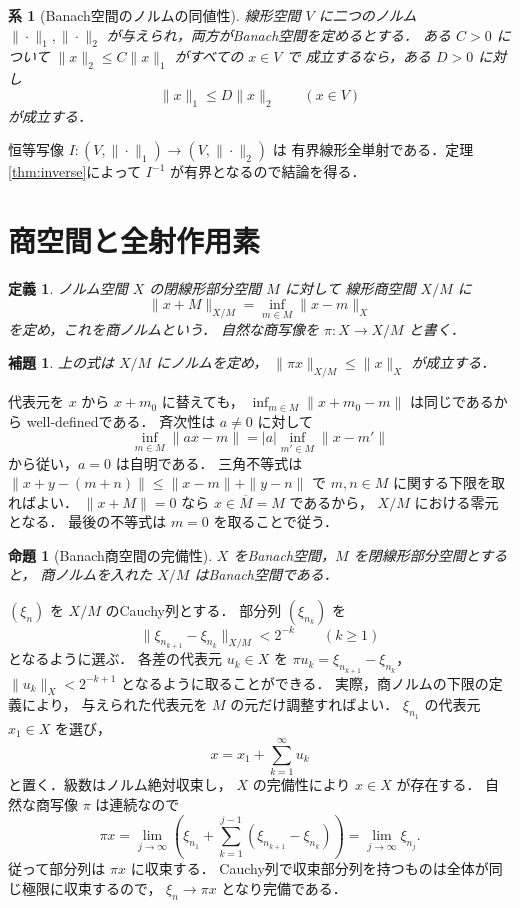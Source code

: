 \documentclass[a5paper,10pt,onecolumn]{jsarticle}
\makeatletter
\theoremstyle{mathnotetheorem}
\newtheorem{definition}[theorem]{定義}
\newtheorem{lemma}[theorem]{補題}
\newtheorem{proposition}[theorem]{命題}
\newtheorem{corollary}[theorem]{系}
\renewcommand{\proofname}{証明}
\renewenvironment{proof}[1][\proofname]{%
  \par\pushQED{\qed}\normalfont\topsep4\p@\@plus2\p@\relax
  \trivlist\item[\hskip\labelsep\bfseries #1]\ignorespaces
}{\popQED\endtrivlist\@endpefalse}
\makeatother
\begin{document}
\begin{corollary}[Banach空間のノルムの同値性]
線形空間 $V$ に二つのノルム $\|\cdot\|_1,\|\cdot\|_2$
が与えられ，両方がBanach空間を定めるとする．
ある $C>0$ について
$\|x\|_2\le C\|x\|_1$ がすべての $x\in V$ で
成立するなら，ある $D>0$ に対し
\[
 \|x\|_1\le D\|x\|_2\qquad(x\in V)
\]
が成立する．
\end{corollary}
\begin{proof}
恒等写像
$I:(V,\|\cdot\|_1)\to(V,\|\cdot\|_2)$ は
有界線形全単射である．定理\ref{thm:inverse}によって
$I^{-1}$ が有界となるので結論を得る．
\end{proof}

\section{商空間と全射作用素}

\begin{definition}
ノルム空間 $X$ の閉線形部分空間 $M$ に対して
線形商空間 $X/M$ に
\[
 \|x+M\|_{X/M}=\inf_{m\in M}\|x-m\|_X
\]
を定め，これを\emph{商ノルム}という．
自然な商写像を $\pi:X\to X/M$ と書く．
\end{definition}

\begin{lemma}\label{lem:quotient-norm}
上の式は $X/M$ にノルムを定め，
$\|\pi x\|_{X/M}\le\|x\|_X$ が成立する．
\end{lemma}
\begin{proof}
代表元を $x$ から $x+m_0$ に替えても，
$\inf_{m\in M}\|x+m_0-m\|$ は同じであるから
well-definedである．
斉次性は $a\ne0$ に対して
\[
 \inf_{m\in M}\|ax-m\|
 =|a|\inf_{m'\in M}\|x-m'\|
\]
から従い，$a=0$ は自明である．
三角不等式は
$\|x+y-(m+n)\|\le\|x-m\|+\|y-n\|$
で $m,n\in M$ に関する下限を取ればよい．
$\|x+M\|=0$ なら $x\in\overline M=M$ であるから，
$X/M$ における零元となる．
最後の不等式は $m=0$ を取ることで従う．
\end{proof}

\begin{proposition}[Banach商空間の完備性]\label{prop:quotient}
$X$ をBanach空間，$M$ を閉線形部分空間とすると，
商ノルムを入れた $X/M$ はBanach空間である．
\end{proposition}
\begin{proof}
$(\xi_n)$ を $X/M$ のCauchy列とする．
部分列 $(\xi_{n_k})$ を
\[
 \|\xi_{n_{k+1}}-\xi_{n_k}\|_{X/M}<2^{-k}
 \qquad(k\ge1)
\]
となるように選ぶ．
各差の代表元 $u_k\in X$ を
$\pi u_k=\xi_{n_{k+1}}-\xi_{n_k}$，
$\|u_k\|_X<2^{-k+1}$ となるように取ることができる．
実際，商ノルムの下限の定義により，
与えられた代表元を $M$ の元だけ調整すればよい．
$\xi_{n_1}$ の代表元 $x_1\in X$ を選び，
\[
 x=x_1+\sum_{k=1}^\infty u_k
\]
と置く．級数はノルム絶対収束し，
$X$ の完備性により $x\in X$ が存在する．
自然な商写像 $\pi$ は連続なので
\[
 \pi x=\lim_{j\to\infty}
 \left(\xi_{n_1}+\sum_{k=1}^{j-1}
 (\xi_{n_{k+1}}-\xi_{n_k})\right)
 =\lim_{j\to\infty}\xi_{n_j}.
\]
従って部分列は $\pi x$ に収束する．
Cauchy列で収束部分列を持つものは全体が同じ極限に収束するので，
$\xi_n\to\pi x$ となり完備である．
\end{proof}
\end{document}
